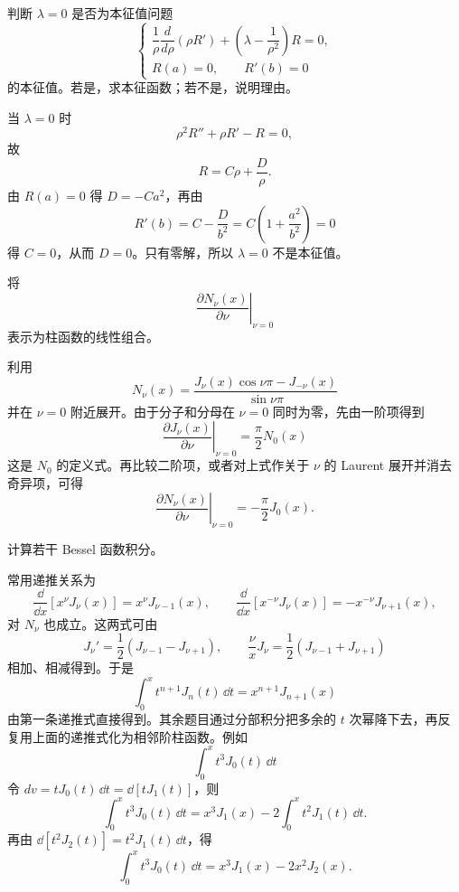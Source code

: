﻿


\begin{question}
判断 \(\lambda=0\) 是否为本征值问题
\[
\begin{cases}
\dfrac1\rho\dfrac d{d\rho}\left(\rho R'\right)+\left(\lambda-\dfrac1{\rho^2}\right)R=0,\\
R(a)=0,\qquad R'(b)=0
\end{cases}
\]
的本征值。若是，求本征函数；若不是，说明理由。
\begin{solution}
当 \(\lambda=0\) 时
\[
\rho^2R''+\rho R'-R=0,
\]
故
\[
R=C\rho+\frac D\rho.
\]
由 \(R(a)=0\) 得 \(D=-Ca^2\)，再由
\[
R'(b)=C-\frac D{b^2}=C\left(1+\frac{a^2}{b^2}\right)=0
\]
得 \(C=0\)，从而 \(D=0\)。只有零解，所以 \(\lambda=0\) 不是本征值。
\end{solution}
\end{question}

\begin{question}
将
\[
\left.\frac{\partial N_\nu(x)}{\partial\nu}\right|_{\nu=0}
\]
表示为柱函数的线性组合。
\begin{solution}
利用
\[
N_\nu(x)=\frac{J_\nu(x)\cos\nu\pi-J_{-\nu}(x)}{\sin\nu\pi}
\]
并在 \(\nu=0\) 附近展开。由于分子和分母在 \(\nu=0\) 同时为零，先由一阶项得到
\[
\left.\frac{\partial J_\nu(x)}{\partial\nu}\right|_{\nu=0}=\frac\pi2N_0(x)
\]
这是 \(N_0\) 的定义式。再比较二阶项，或者对上式作关于 \(\nu\) 的 Laurent 展开并消去奇异项，可得
\[
\left.\frac{\partial N_\nu(x)}{\partial\nu}\right|_{\nu=0}
=-\frac\pi2J_0(x).
\]
\end{solution}
\end{question}

\begin{question}
计算若干 Bessel 函数积分。
\begin{solution}
常用递推关系为
\[
\frac{\dd}{\dd{x}}\left[x^\nu J_\nu(x)\right]=x^\nu J_{\nu-1}(x),\qquad
\frac{\dd}{\dd{x}}\left[x^{-\nu}J_\nu(x)\right]=-x^{-\nu}J_{\nu+1}(x),
\]
对 \(N_\nu\) 也成立。这两式可由
\[
J_\nu'=\frac12(J_{\nu-1}-J_{\nu+1}),\qquad
\frac{\nu}{x}J_\nu=\frac12(J_{\nu-1}+J_{\nu+1})
\]
相加、相减得到。于是
\[
\int_0^x t^{n+1}J_n(t)\,\dd{t}=x^{n+1}J_{n+1}(x)
\]
由第一条递推式直接得到。其余题目通过分部积分把多余的 \(t\) 次幂降下去，再反复用上面的递推式化为相邻阶柱函数。例如
\[
\int_0^x t^3J_0(t)\,\dd{t}
\]
令 \(dv=tJ_0(t)\,\dd{t}=\dd[tJ_1(t)]\)，则
\[
\int_0^x t^3J_0(t)\,\dd{t}
=x^3J_1(x)-2\int_0^x t^2J_1(t)\,\dd{t}.
\]
再由 \(\dd[t^2J_2(t)]=t^2J_1(t)\,\dd{t}\)，得
\[
\int_0^x t^3J_0(t)\,\dd{t}
=x^3J_1(x)-2x^2J_2(x).
\]

\end{solution}
\end{question}

